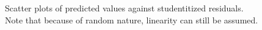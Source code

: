 \begin{figure}[h]
\centering
	
\quad
	
\caption{Scatter plots of predicted values against studentitized residuals. Note that because of random nature, linearity can still be assumed.}
\end{figure}